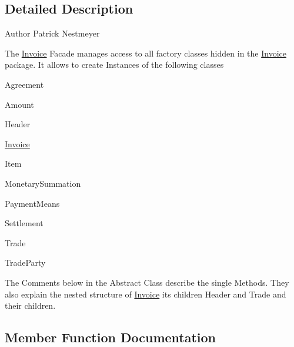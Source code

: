 \subsection{Detailed Description}
\begin{DoxyAuthor}{Author}
Patrick Nestmeyer
\end{DoxyAuthor}
The \hyperlink{namespace_invoice}{Invoice} Facade manages access to all factory classes hidden in the \hyperlink{namespace_invoice}{Invoice} package. It allows to create Instances of the following classes
\begin{DoxyItemize}
\item Agreement
\item Amount
\item Header
\item \hyperlink{namespace_invoice}{Invoice}
\item Item
\item Monetary\+Summation
\item Payment\+Means
\item Settlement
\item Trade
\item Trade\+Party
\end{DoxyItemize}

The Comments below in the Abstract Class describe the single Methods. They also explain the nested structure of \hyperlink{namespace_invoice}{Invoice} its children Header and Trade and their children. 

\subsection{Member Function Documentation}
